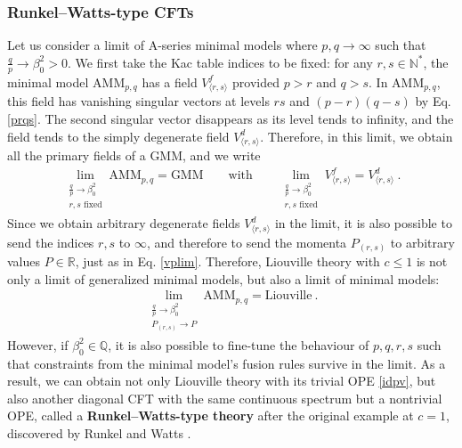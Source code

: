 \documentclass[12pt, a4paper]{article}
\newcommand{\myindex}[1]{\textbf{\boldmath #1}}
\begin{document}
\subsubsection{Runkel--Watts-type CFTs}\label{sec:rwt}

Let us consider a limit of A-series minimal models where $p,q\to\infty$ such that $\frac{q}{p}\to \beta_0^2>0$. We first take the Kac table indices to be fixed: for any $r,s\in\mathbb{N}^*$, the minimal model AMM$_{p,q}$ has a
field $V^f_{\langle r,s\rangle}$
provided $p>r$ and $q>s$. In AMM$_{p,q}$, this field has vanishing singular vectors at levels $rs$ and $(p-r)(q-s)$ by Eq. \eqref{prqs}. The second singular vector disappears as its level tends to infinity, and the field tends to the simply degenerate field $V^d_{\langle r,s\rangle}$. Therefore, in this limit, we obtain all the primary fields of a GMM, and we write
\begin{align}
 \lim_{\substack{\frac{q}{p}\to \beta_0^2\\ r,s\text{ fixed}}} \text{AMM}_{p,q} = \text{GMM}\qquad \text{with} \qquad \lim_{\substack{\frac{q}{p}\to \beta_0^2\\ r,s\text{ fixed}}}
V^f_{\langle r,s\rangle} = V^d_{\langle r,s\rangle}\ .
 \label{mm-gmm}
\end{align}
Since we obtain arbitrary degenerate fields $V^d_{\langle r,s\rangle}$ in the limit, it is also possible to send the indices $r,s$ to $\infty$, and therefore to send the momenta $P_{(r,s)}$ to arbitrary values $P\in\mathbb{R}$, just as in Eq. \eqref{vplim}. Therefore, Liouville theory with $c\leq 1$ is not only a limit of generalized minimal models, but also a limit of minimal models:
\begin{align}
 \lim_{\substack{\frac{q}{p}\to \beta_0^2\\ P_{(r,s)}\to P}} \text{AMM}_{p,q} = \text{Liouville}\ . 
 \label{mm-liou}
\end{align}
However, if $\beta_0^2\in\mathbb{Q}$, it is also possible to fine-tune the behaviour of $p,q,r,s$ such that constraints from the minimal model's fusion rules survive in the limit. As a result, we can obtain not only Liouville theory with its trivial OPE \eqref{idpv}, but also another diagonal CFT with the same continuous spectrum but a nontrivial OPE, called a \myindex{Runkel--Watts-type theory} after the original example at $c=1$, discovered by Runkel and Watts \cite{rw01}.
\end{document}

